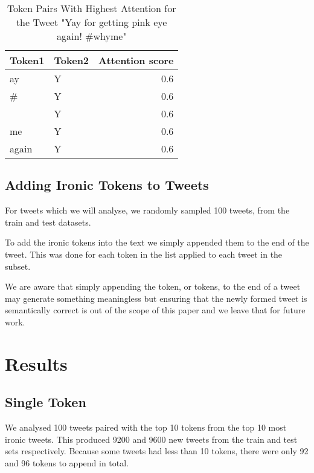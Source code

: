 \documentclass[10pt, a4paper]{article}
\begin{document}
\begin{table*}
\caption{Token Pairs With Highest Attention for the Tweet "Yay for getting pink eye again!  \#whyme"}
\label{tab:attention-tokens-pairs}
\begin{center}
\begin{tabular}{llr}
\toprule
Token1 & Token2 & Attention score\\
\midrule
ay                  & Y & 0.6 \\
\#                  & Y & 0.6 \\
\textvisiblespace   & Y & 0.6 \\
me                  & Y & 0.6 \\
again               & Y & 0.6 \\
\bottomrule
\end{tabular}
\end{center}
\end{table*}

\subsection{Adding Ironic Tokens to Tweets}

For tweets which we will analyse, we randomly sampled 100 tweets, from the train and test datasets.

To add the ironic tokens into the text we simply appended them to the end of the tweet. This was done for each token in the list applied to each tweet in the subset.

We are aware that simply appending the token, or tokens, to the end of a tweet may generate something meaningless but ensuring that the newly formed tweet is semantically correct is out of the scope of this paper and we leave that for future work.

\section{Results}

\subsection{Single Token}

We analysed 100 tweets paired with the top 10 tokens from the top 10 most ironic tweets.
This produced 9200 and 9600 new tweets from the train and test sets respectively.
Because some tweets had less than 10 tokens, there were only 92 and 96 tokens to append in total.
\end{document}
